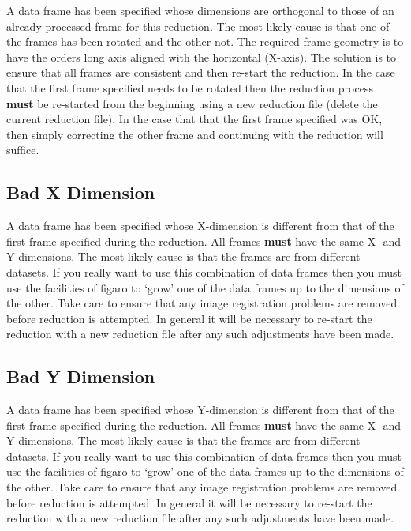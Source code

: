 \documentclass[11pt,twoside]{article}
\newcommand{\xref}[3]{#1}
\newcommand{\xlabel}[1]{}
\newcommand{\mlabel}[1]{\xlabel{#1}\label{#1}}
\newcommand{\myindex}[1]{\index{#1}}
\renewcommand{\myindex}[1]{}
\begin{document}
A data frame has been specified whose dimensions are orthogonal to those
of an already processed frame for this reduction. The most likely cause
is that one of the frames has been rotated and the other not. The
required frame geometry is to have the orders long axis aligned with the
horizontal (X-axis). The solution is to ensure that all
frames are consistent  and then re-start the reduction. In the case that
the first frame specified needs to be rotated then the reduction process
{\bf must} be re-started from the beginning using a new reduction file (delete
the current reduction file). In the case that that the first frame
specified was OK, then simply correcting the other frame and continuing
with the reduction will suffice.

\subsection{\mlabel{bad_x_dimension} Bad X Dimension}
\myindex{Frame dimensions}

A data frame has been specified whose X-dimension is different from that
of the first frame specified during the reduction. All frames {\bf must} have
the same X- and Y-dimensions. The most likely cause is that the frames
are from different datasets. If you really want to use this combination
of data frames then you must use the facilities of \xref{{\sc figaro}}{sun86}{}
to `grow' one
of the data frames up to the dimensions of the other.
Take care to ensure that any image registration problems are removed
before reduction is attempted.
In general it will be necessary to re-start the reduction with a new
reduction file after any such adjustments have been made.

\subsection{\mlabel{bad_y_dimension} Bad Y Dimension}

A data frame has been specified whose Y-dimension is different from that
of the first frame specified during the reduction. All frames {\bf must} have
the same X- and Y-dimensions. The most likely cause is that the frames
are from different datasets. If you really want to use this combination
of data frames then you must use the facilities of \xref{{\sc figaro}}{sun86}{}
to `grow' one
of the data frames up to the dimensions of the other.
Take care to ensure that any image registration problems are removed
before reduction is attempted.
In general it will be necessary to re-start the reduction with a new
reduction file after any such adjustments have been made.
\end{document}
